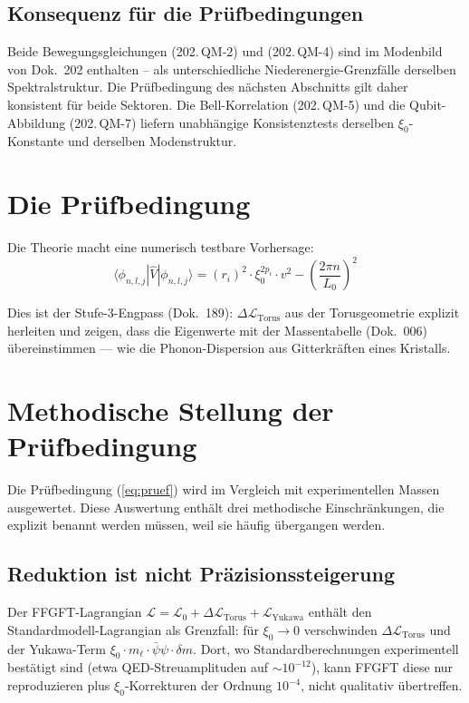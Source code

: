 \subsection*{Konsequenz für die Prüfbedingungen}

Beide Bewegungsgleichungen (202.\,QM-2) und (202.\,QM-4) sind im
Modenbild von Dok.~202 enthalten -- als unterschiedliche
Niederenergie-Grenzfälle derselben Spektralstruktur. Die
Prüfbedingung des nächsten Abschnitts gilt daher konsistent für beide
Sektoren. Die Bell-Korrelation (202.\,QM-5) und die Qubit-Abbildung
(202.\,QM-7) liefern unabhängige Konsistenztests derselben
$\xi_0$-Konstante und derselben Modenstruktur.

\section{Die Prüfbedingung}

Die Theorie macht eine numerisch testbare Vorhersage:
\begin{equation}
  \boxed{
    \langle\phi_{n,l,j}|\hat{V}|\phi_{n,l,j}\rangle
    = (r_i)^2 \cdot \xi_0^{2p_i} \cdot v^2
      - \left(\frac{2\pi n}{L_0}\right)^2
  }
  \label{eq:pruef}
\end{equation}

Dies ist der Stufe-3-Engpass (Dok.~189): $\Delta\mathcal{L}_{\text{Torus}}$
aus der Torusgeometrie explizit herleiten und zeigen, dass die Eigenwerte
mit der Massentabelle (Dok.~006) übereinstimmen — wie die Phonon-Dispersion
aus Gitterkräften eines Kristalls.

\section{Methodische Stellung der Prüfbedingung}

Die Prüfbedingung (\ref{eq:pruef}) wird im Vergleich mit experimentellen
Massen ausgewertet. Diese Auswertung enthält drei methodische
Einschränkungen, die explizit benannt werden müssen, weil sie häufig
übergangen werden.

\subsection*{Reduktion ist nicht Präzisionssteigerung}

Der FFGFT-Lagrangian
$\mathcal{L} = \mathcal{L}_0 + \Delta\mathcal{L}_{\text{Torus}} + \mathcal{L}_{\text{Yukawa}}$
enthält den Standardmodell-Lagrangian als Grenzfall: für $\xi_0 \to 0$
verschwinden $\Delta\mathcal{L}_{\text{Torus}}$ und der Yukawa-Term
$\xi_0\cdot m_\ell\cdot\bar\psi\psi\cdot\delta m$. Dort, wo
Standardberechnungen experimentell bestätigt sind (etwa QED-Streuamplituden
auf $\sim 10^{-12}$), kann FFGFT diese nur reproduzieren plus
$\xi_0$-Korrekturen der Ordnung $10^{-4}$, nicht qualitativ übertreffen.

